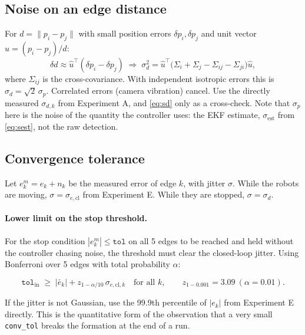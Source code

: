 \documentclass[11pt,a4paper]{article}
\begin{document}
\subsection{Noise on an edge distance}
\label{sec:edge}
For $d=\|p_i-p_j\|$ with small position errors $\delta p_i,\delta p_j$ and
unit vector $\hat u=(p_i-p_j)/d$:
\begin{equation}
  \delta d\approx\hat u^\top(\delta p_i-\delta p_j)
  \;\Rightarrow\;
  \sigma_d^2=\hat u^\top\bigl(\Sigma_i+\Sigma_j-\Sigma_{ij}-\Sigma_{ji}\bigr)\hat u,
  \label{eq:sd}
\end{equation}
where $\Sigma_{ij}$ is the cross-covariance. With independent isotropic
errors this is $\sigma_d=\sqrt2\,\sigma_p$. Correlated errors (camera
vibration) cancel. Use the directly measured $\sigma_{d,k}$ from
Experiment A, and \eqref{eq:sd} only as a cross-check. Note that
$\sigma_p$ here is the noise of the quantity the controller uses: the EKF
estimate, $\sigma_\text{est}$ from \eqref{eq:sest}, not the raw detection.

\subsection{Convergence tolerance}
Let $e_k^m=e_k+n_k$ be the measured error of edge $k$, with jitter
$\sigma$. While the robots are moving, $\sigma=\sigma_{e,\text{cl}}$ from
Experiment E. While they are stopped, $\sigma=\sigma_d$.

\paragraph{Lower limit on the stop threshold.}
For the stop condition $|e^m_k|\le\texttt{tol}$ on all 5 edges to be
reached and held without the controller chasing noise, the threshold
must clear the closed-loop jitter. Using Bonferroni over 5 edges with
total probability $\alpha$:
\begin{mathbox}
\begin{equation}
  \texttt{tol}_\text{in}\;\ge\;|\bar e_k|+z_{1-\alpha/10}\,\sigma_{e,\text{cl},k}\quad\text{for all }k,
  \qquad z_{1-0.001}=3.09\ (\alpha=0.01).
  \label{eq:tolin}
\end{equation}
\end{mathbox}
If the jitter is not Gaussian, use the 99.9th percentile of $|e_k|$ from
Experiment E directly. This is the quantitative form of the observation
that a very small \texttt{conv\_tol} breaks the formation at the end of a run.
\end{document}
